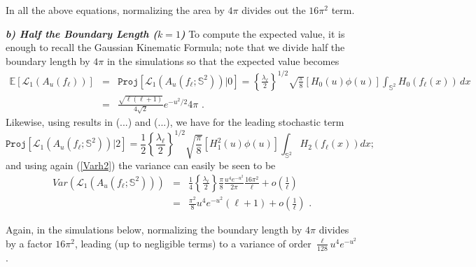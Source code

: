 \documentclass[aps,prd,showpacs,superscriptaddress,groupedaddress]{revtex4-1}  %
\begin{document}
In all the above equations, normalizing the area by $4\pi$ divides out the $16\pi^2$ term.

\vspace{0.5cm}

\emph{\bf b) Half the Boundary Length ($k=1$)} %
To compute the expected value, it is enough to recall the Gaussian Kinematic Formula; note that we divide half the boundary length by $4\pi$ in the simulations so that the expected value becomes 
\begin{eqnarray*}
\mathbb{E}[\mathcal{L}_{1}(A_{u}(f_{\ell }))]&=&    \mathtt{Proj}[\mathcal{L}_{1}(A_{u}(f_{\ell };\mathbb{S}^{2}))|0] =\left\{
\frac{\lambda _{\ell }}{2}\right\} ^{1/2}\sqrt{\frac{\pi }{8}}\left[
H_{0}(u)\phi (u)\right] \int_{\mathbb{S}^2} H_0(f_\ell(x))\,dx\\
&=& \frac{\sqrt{\ell(\ell+1)}}{4\sqrt{2}}e^{-u^2/2}4\pi \text{ .}
\end{eqnarray*}
Likewise, using results in (...) and (...), we have for the leading stochastic term
\begin{equation*}
\mathtt{Proj}[\mathcal{L}_{1}(A_{u}(f_{\ell };\mathbb{S}^{2}))|2]=\frac{1}{2}%
\left\{ \frac{\lambda _{\ell }}{2}\right\} ^{1/2}\sqrt{\frac{\pi }{8}}\left[
H_{1}^{2}(u)\phi (u)\right] \int_{\mathbb{S}^{2}}H_{2}(f_{\ell }(x))dx\text{
;}
\end{equation*}
and using again (\ref{Varh2}) the variance can easily be seen to be  
\begin{eqnarray}
    Var \left( \mathcal{L}_{1}(A_{u}(f_{\ell };\mathbb{S}^{2})) \right) &=& 
    \frac{1}{4}\left\{ \frac{\lambda _{\ell }}{2}\right\}\frac{\pi }{8}\frac{u^4e^{-u^2}}{2\pi}\frac{16\pi^2}{\ell}+o(\frac{1}{\ell}) \\
    &=& \frac{\pi^2}{8}u^4e^{-u^2}(\ell+1)+o(\frac{1}{\ell}) \text{ .}
\end{eqnarray}


Again, in the simulations below, normalizing the boundary length by $4\pi$ divides by a factor $16\pi^2$, leading (up to negligible terms) to a variance of order $\frac{\ell}{128}u^4e^{-u^2}$. 
\end{document}
